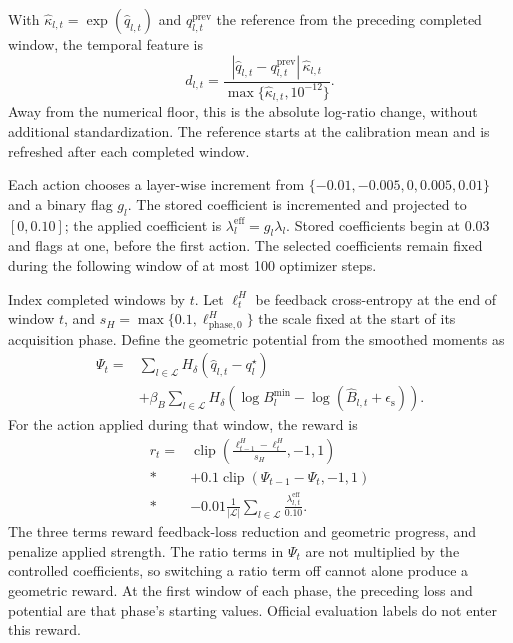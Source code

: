 \documentclass[10pt,a4paper,twocolumn]{article}
\newcommand{\Clip}{\operatorname{clip}}
\newcommand{\epss}{\epsilon_{\mathrm{s}}}
\begin{document}
With $\widehat\kappa_{l,t}=\exp(\widehat q_{l,t})$ and
$q^{\mathrm{prev}}_{l,t}$ the reference from the preceding completed
window, the temporal feature is
\begin{equation}
 d_{l,t}=\frac{
 |\widehat q_{l,t}-q^{\mathrm{prev}}_{l,t}|\,\widehat\kappa_{l,t}}
 {\max\{\widehat\kappa_{l,t},10^{-12}\}}.
 \label{eq:full_temporal_state}
\end{equation}
Away from the numerical floor, this is the absolute log-ratio change,
without additional standardization. The reference starts at the
calibration mean and is refreshed after each completed window.

Each action chooses a layer-wise increment from
$\{-0.01,-0.005,0,0.005,0.01\}$ and a binary flag $g_l$.
The stored coefficient is incremented and projected to $[0,0.10]$;
the applied coefficient is $\lambda_l^{\mathrm{eff}}=g_l\lambda_l$.
Stored coefficients begin at $0.03$ and flags at one, before the first
action. The selected coefficients remain fixed during the following
window of at most 100 optimizer steps.

Index completed windows by $t$. Let $\ell_t^H$ be feedback
cross-entropy at the end of window $t$, and
$s_H=\max\{0.1,\ell^H_{\mathrm{phase},0}\}$ the scale fixed at the
start of its acquisition phase. Define the geometric potential from
the smoothed moments as
\[
 \begin{aligned}
 \Psi_t={}&\sum_{l\in\mathcal L}H_\delta(\widehat q_{l,t}-q_l^\star)\\
 &+\beta_B\sum_{l\in\mathcal L}H_\delta\!\left(
 \log B_l^{\min}-\log(\widehat B_{l,t}+\epss)\right).
 \end{aligned}
\]
For the action applied during that window, the reward is
\begin{align}
 r_t={}&
 \Clip\!\left(
 \frac{\ell_{t-1}^H-\ell_t^H}{s_H},-1,1\right)
 \nonumber\\*
 &+0.1\Clip(\Psi_{t-1}-\Psi_t,-1,1)
 \nonumber\\*
 &-0.01\frac1{|\mathcal L|}
 \sum_{l\in\mathcal L}\frac{\lambda_{l,t}^{\mathrm{eff}}}{0.10}.
 \label{eq:reward}
\end{align}
The three terms reward feedback-loss reduction and geometric progress,
and penalize applied strength. The ratio terms in $\Psi_t$ are not
multiplied by the controlled coefficients, so switching a ratio term
off cannot alone produce a geometric reward. At the first window of
each phase, the preceding loss and potential are that phase's starting
values. Official evaluation labels do not enter this reward.
\end{document}
